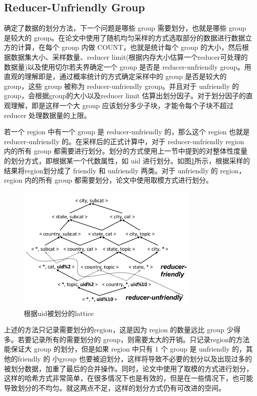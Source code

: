 \subsection{Reducer-Unfriendly Group}

确定了数据的划分方法，下一个问题是哪些 group 需要划分，也就是哪些 group 是较大的 group。在论文中使用了随机均匀采样的方式选取部分的数据进行数据立方的计算，在每个 group 内做 COUNT，也就是统计每个 group 的大小，然后根据数据集大小、采样数量、reducer limit(根据内存大小估算一个reducer可处理的数据量)以及使用切尔若夫界确定一个 group 是否是 reducer-unfriendly group。用直观的理解即是，通过概率统计的方式确定采样中的 group 是否是较大的 group，这些 group 被称为 reducer-unfriendly group。并且对于 unfriendly 的 group，会根据group的大小以及reducer limit 估算出划分因子。对于划分因子的直观理解，即是这样一个大 group 应该划分多少子块，才能令每个子块不超过 reducer 处理数据量的上限。

若一个 region 中有一个 group 是 reducer-unfriendly 的，那么这个 region 也就是 reducer-unfriendly 的。在采样后的正式计算中，对于 reducer-unfriendly region 内的所有 group 都需要进行划分。划分的方式使用上一节中提到的对整体性度量的划分方式，即根据某一个代数属性，如 uid 进行划分。如图\ref{region_partition}所示，根据采样的结果将region划分成了 friendly 和 unfriendly 两类。对于 unfriendly 的 region，region 内的所有 group 都需要划分，论文中使用取模方式进行划分。

\begin{figure}[!htb]
\centering\includegraphics[width=3.5in]{picture/ch_datacube_mr/region_partition} 
\caption{根据uid被划分的lattice}\label{region_partition} 
\end{figure} 

上述的方法只记录需要划分的region，这是因为 region 的数量远比 group 少得多。若要记录所有的需要划分的 group，则需要太大的开销。只记录region的方法能保证大 group 的划分，但是如果 region 中只有 1 个 group 是 unfriendly 的，其他的friendly 的 小group 也要被迫划分，这样将导致不必要的划分以及出现过多的被划分数据，加重了最后的合并操作。同时，论文中使用了取模的方式进行划分，这样的哈希方式非常简单，在很多情况下也是有效的，但是在一些情况下，也可能导致划分的不均匀。就这两点不足，这样的划分方式仍有可改进的空间。

